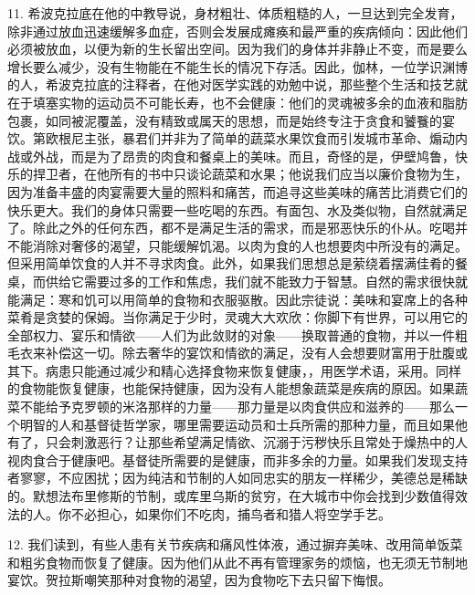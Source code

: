 11. 希波克拉底在他的中教导说，身材粗壮、体质粗糙的人，一旦达到完全发育，除非通过放血迅速缓解多血症，否则会发展成瘫痪和最严重的疾病倾向：因此他们必须被放血，以便为新的生长留出空间。因为我们的身体并非静止不变，而是要么增长要么减少，没有生物能在不能生长的情况下存活。因此，伽林，一位学识渊博的人，希波克拉底的注释者，在他对医学实践的劝勉中说，那些整个生活和技艺就在于填塞实物的运动员不可能长寿，也不会健康：他们的灵魂被多余的血液和脂肪包裹，如同被泥覆盖，没有精致或属天的思想，而是始终专注于贪食和饕餮的宴饮。第欧根尼主张，暴君们并非为了简单的蔬菜水果饮食而引发城市革命、煽动内战或外战，而是为了昂贵的肉食和餐桌上的美味。而且，奇怪的是，伊壁鸠鲁，快乐的捍卫者，在他所有的书中只谈论蔬菜和水果；他说我们应当以廉价食物为生，因为准备丰盛的肉宴需要大量的照料和痛苦，而追寻这些美味的痛苦比消费它们的快乐更大。我们的身体只需要一些吃喝的东西。有面包、水及类似物，自然就满足了。除此之外的任何东西，都不是满足生活的需求，而是邪恶快乐的仆从。吃喝并不能消除对奢侈的渴望，只能缓解饥渴。以肉为食的人也想要肉中所没有的满足。但采用简单饮食的人并不寻求肉食。此外，如果我们思想总是萦绕着摆满佳肴的餐桌，而供给它需要过多的工作和焦虑，我们就不能致力于智慧。自然的需求很快就能满足：寒和饥可以用简单的食物和衣服驱散。因此宗徒说：美味和宴席上的各种菜肴是贪婪的保姆。当你满足于少时，灵魂大大欢欣：你脚下有世界，可以用它的全部权力、宴乐和情欲——人们为此敛财的对象——换取普通的食物，并以一件粗毛衣来补偿这一切。除去奢华的宴饮和情欲的满足，没有人会想要财富用于肚腹或其下。病患只能通过减少和精心选择食物来恢复健康，，用医学术语，采用。同样的食物能恢复健康，也能保持健康，因为没有人能想象蔬菜是疾病的原因。如果蔬菜不能给予克罗顿的米洛那样的力量——那力量是以肉食供应和滋养的——那么一个明智的人和基督徒哲学家，哪里需要运动员和士兵所需的那种力量，而且如果他有了，只会刺激恶行？让那些希望满足情欲、沉溺于污秽快乐且常处于燥热中的人视肉食合于健康吧。基督徒所需要的是健康，而非多余的力量。如果我们发现支持者寥寥，不应困扰；因为纯洁和节制的人如同忠实的朋友一样稀少，美德总是稀缺的。默想法布里修斯的节制，或库里乌斯的贫穷，在大城市中你会找到少数值得效法的人。你不必担心，如果你们不吃肉，捕鸟者和猎人将空学手艺。\par

12. 我们读到，有些人患有关节疾病和痛风性体液，通过摒弃美味、改用简单饭菜和粗劣食物而恢复了健康。因为他们从此不再有管理家务的烦恼，也无须无节制地宴饮。贺拉斯嘲笑那种对食物的渴望，因为食物吃下去只留下悔恨。\par

\par

